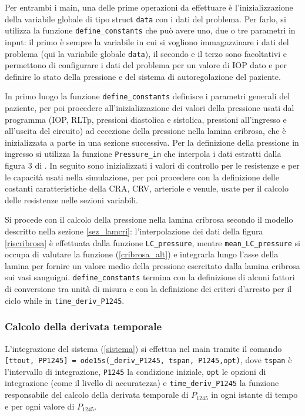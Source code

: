 \documentclass{article}
\begin{document}
Per entrambi i main, una delle prime operazioni da effettuare è l'inizializzazione della variabile globale di tipo struct \texttt{data} con i dati del problema.
Per farlo, si utilizza la funzione \texttt{define\_constants} che può avere uno, due o tre parametri in input: il primo è sempre la variabile in cui si vogliono immagazzinare i dati del problema (qui la variabile globale \texttt{data}), il secondo e il terzo sono facoltativi e permettono di configurare i dati del problema per un valore di IOP dato e per definire lo stato della pressione e del sistema di autoregolazione del paziente.

In primo luogo la funzione \texttt{define\_constants} definisce i parametri generali del paziente, per poi procedere all'inizializzazione dei valori della pressione usati dal programma (IOP, RLTp, pressioni diastolica e sistolica, pressioni all'ingresso e all'uscita del circuito) ad eccezione della pressione nella lamina cribrosa, che è inizializzata a parte in una sezione successiva.
Per la definizione della pressione in ingresso si utilizza la funzione \texttt{Pressure\_in} che interpola i dati estratti dalla figura 3 di \cite{art1}.
In seguito sono inizializzati i valori di controllo per le resistenze e per le capacità usati nella simulazione, per poi procedere con la definizione delle costanti caratteristiche della CRA, CRV, arteriole e venule, usate per il calcolo delle resistenze nelle sezioni variabili.

Si procede con il calcolo della pressione nella lamina cribrosa secondo il modello descritto nella sezione \ref{sez_lamcri}: l'interpolazione dei dati della figura \ref{riscribrosa} è effettuata dalla funzione \texttt{LC\_pressure}, mentre \texttt{mean\_LC\_pressure} si occupa di valutare la funzione (\ref{cribrosa_alt}) e integrarla lungo l'asse della lamina per fornire un valore medio della pressione esercitato dalla lamina cribrosa sui vasi sanguigni.
\texttt{define\_constants} termina con la definizione di alcuni fattori di conversione tra unità di misura e con la definizione dei criteri d'arresto per il ciclo while in \texttt{time\_deriv\_P1245}.

\subsubsection*{Calcolo della derivata temporale}
L'integrazione del sistema (\ref{sistema}) si effettua nel main tramite il comando \texttt{[ttout, PP1245] = ode15s(\@time\_deriv\_P1245, tspan, P1245,opt)}, dove \texttt{tspan} è l'intervallo di integrazione, \texttt{P1245} la condizione iniziale, \texttt{opt} le opzioni di integrazione (come il livello di accuratezza) e \texttt{time\_deriv\_P1245} la funzione responsabile del calcolo della derivata temporale di $P_{1245}$ in ogni istante di tempo e per ogni valore di $P_{1245}$.
\end{document}
